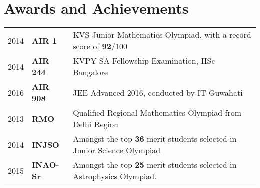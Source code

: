 \documentclass[]{deedy-resume-openfont}
\begin{document}
\begin{minipage}[t]{0.70\textwidth}
\section{Awards and Achievements} 
\begin{tabular}{rll}
  2014	   & \textbf{AIR 1}  & KVS Junior Mathematics Olympiad, with a record score of \textbf{92}/100 \\
  2014	   & \textbf{AIR 244}& KVPY-SA Fellowship Examination, IISc Bangalore \\
  2016     & \textbf{AIR 908}& JEE Advanced 2016, conducted by IT-Guwahati \\
  2013	    & \textbf{RMO}     & Qualified Regional Mathematics Olympiad from Delhi Region \\
  2014	    & \textbf{INJSO}   & Amongst the top \textbf{36} merit students selected in Junior Science Olympiad   \\
  2015      & \textbf{INAO-Sr} & Amongst the top \textbf{25} merit students selected in Astrophysics Olympiad.
\end{tabular}

%
%

%

\end{minipage} 
\end{document}
